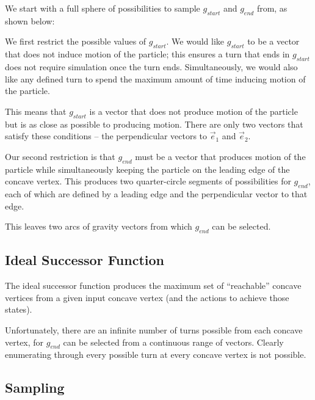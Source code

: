 We start with a full sphere of possibilities to sample $g_{start}$ and $g_{end}$ from, as shown below:


We first restrict the possible values of $g_{start}$. We would like $g_{start}$ to be a vector that does not induce motion of the particle; this ensures a turn that ends in $g_{start}$ does not require simulation once the turn ends. Simultaneously, we would also like any defined turn to spend the maximum amount of time inducing motion of the particle.

This means that $g_{start}$ is a vector that does not produce motion of the particle but is as close as possible to producing motion. There are only two vectors that satisfy these conditions -- the perpendicular vectors to $\vec{e}_1$ and $\vec{e}_2$.


Our second restriction is that $g_{end}$ must be a vector that produces motion of the particle while simultaneously keeping the particle on the leading edge of the concave vertex. This produces two quarter-circle segments of possibilities for $g_{end}$, each of which are defined by a leading edge and the perpendicular vector to that edge.



This leaves two arcs of gravity vectors from which $g_{end}$ can be selected.

	\subsection{Ideal Successor Function}

The ideal successor function produces the maximum set of ``reachable'' concave vertices from a given input concave vertex (and the actions to achieve those states).

Unfortunately, there are an infinite number of turns possible from each concave vertex, for $g_{end}$ can be selected from a continuous range of vectors. Clearly enumerating through every possible turn at every concave vertex is not possible.

	\subsection{Sampling}

